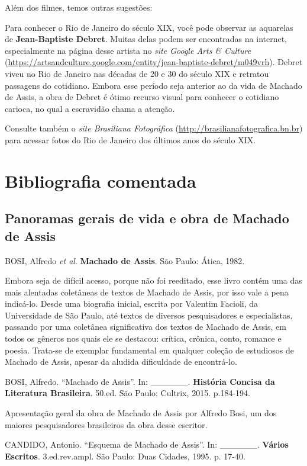 \documentclass[12pt]{extarticle}
\begin{document}
Além dos filmes, temos outras sugestões:

Para conhecer o Rio de Janeiro do século XIX, você pode observar as
aquarelas de \textbf{Jean-Baptiste Debret}. Muitas delas podem ser
encontradas na internet, especialmente na página desse artista no
\emph{site Google Arts \& Culture}
(\url{https://artsandculture.google.com/entity/jean-baptiste-debret/m049vrh}).
Debret viveu no Rio de Janeiro nas décadas de 20 e 30 do século XIX e
retratou passagens do cotidiano. Embora esse período seja anterior ao da
vida de Machado de Assis, a obra de Debret é ótimo recurso visual para
conhecer o cotidiano carioca, no qual a escravidão chama a atenção.

Consulte também o \emph{site Brasiliana Fotográfica}
(\url{http://brasilianafotografica.bn.br}) para acessar fotos do Rio de
Janeiro dos últimos anos do século XIX.

\section{Bibliografia comentada}

\subsection{Panoramas gerais de vida e obra de Machado de Assis}

BOSI, Alfredo \emph{et al}. \textbf{Machado de Assis}. São Paulo: Ática,
1982.

Embora seja de difícil acesso, porque não foi reeditado, esse livro
contém uma das mais alentadas coletâneas de textos de Machado de Assis,
por isso vale a pena indicá-lo. Desde uma biografia inicial, escrita por
Valentim Facioli, da Universidade de São Paulo, até textos de diversos
pesquisadores e especialistas, passando por uma coletânea significativa
dos textos de Machado de Assis, em todos os gêneros nos quais ele se
destacou: crítica, crônica, conto, romance e poesia. Trata-se de
exemplar fundamental em qualquer coleção de estudiosos de Machado de
Assis, apesar da aludida dificuldade de encontrá-lo.

BOSI, Alfredo. ``Machado de Assis''. In: \_\_\_\_\_\_. \textbf{História
Concisa da Literatura Brasileira}. 50.ed. São Paulo: Cultrix, 2015.
p.184-194.

Apresentação geral da obra de Machado de Assis por Alfredo Bosi, um dos
maiores pesquisadores brasileiros da obra desse escritor.

CANDIDO, Antonio. ``Esquema de Machado de Assis''. In: \_\_\_\_\_\_.
\textbf{Vários Escritos}. 3.ed.rev.ampl. São Paulo: Duas Cidades, 1995.
p. 17-40.
\end{document}
